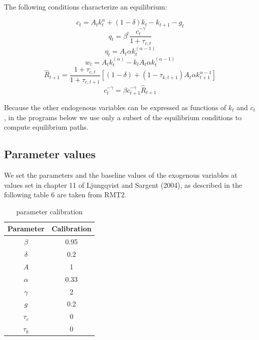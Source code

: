 \documentclass[a4paper,12pt]{scrartcl} %
\begin{document}
The following conditions characterize an equilibrium:

\begin{equation}\label{14}
   c_t=A_tk_t^{\alpha}+(1-\delta)k_t-k_{t+1}-g_t
\end{equation}
\begin{equation}\label{15}
   q_t=\beta^t\frac{c_t^{-\gamma}}{1+\tau_{c,t}}
\end{equation}
\begin{equation}\label{16}
   \eta_t=A_t\alpha k_t^(\alpha-1)
\end{equation}
\begin{equation}\label{17}
    w_t=A_tk_t^(\alpha)-k_tA_t\alpha k_t^(\alpha-1)
\end{equation}
\begin{equation}\label{18}
    \hat{R}_{t+1}=\frac{1+\tau_{c,t}}{1+\tau_{c,t+1}}[(1-\delta)+(1-\tau_{k,t+1})A_t\alpha k_{t+1}^{\alpha-1}]
\end{equation}
\begin{equation}\label{19}
    c_t^{-\gamma}=\beta c_{t+1}^{-\gamma}\hat{R}_{t+1}
\end{equation}

Because the other endogenous variables can be expressed as functions of $k_t$ and $c_t$, in the programs below we use only a subset of the equilibrium conditions to compute equilibrium paths.

\subsection{Parameter values}

We set the parameters and the baseline values of the exogenous variables at values set in chapter 11 of Ljungqvist and Sargent (2004), as described in the following table 6 are taken from RMT2.

\begin{table}[h]
\centering\caption{parameter calibration}\label{7}
\begin{tabular}{cc}
  \hline
  Parameter&Calibration\\
  \hline
  $\beta$&0.95\\
  $\delta$&0.2\\
  $A$&1\\
  $\alpha$&0.33\\
  $\gamma$&2\\
  $g$&0.2\\
  $\tau_c$&0\\
  $\tau_k$&0\\
  \hline
  \end{tabular}
\end{table}
\end{document}
